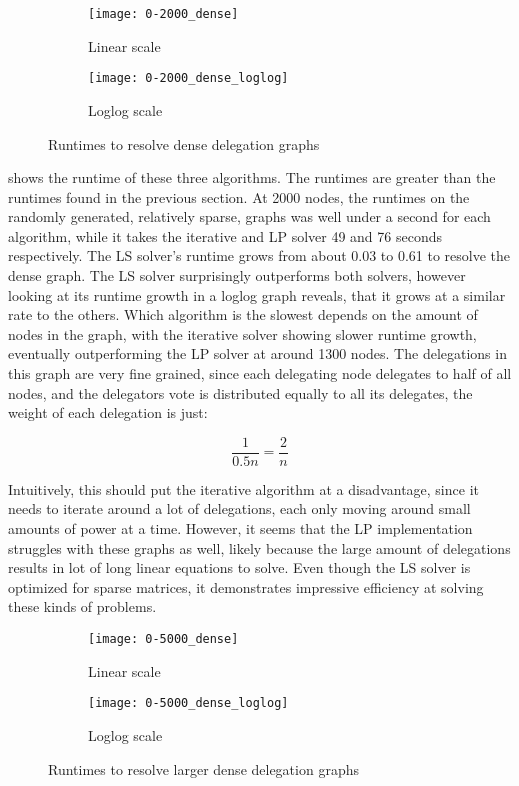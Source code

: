 \begin{figure}[t]
    \centering
    \begin{subfigure}[t]{0.45\textwidth}
    	\centering
    	\texttt{[image: 0-2000\_dense]}
    	\caption{Linear scale}
    	\label{fig:dense-linear}
    \end{subfigure}
    \hfill
    \begin{subfigure}[t]{0.45\textwidth}
        \centering
        \texttt{[image: 0-2000\_dense\_loglog]}
        \caption{Loglog scale}
         \label{subfig:dense-loglog}
    \end{subfigure}
    \caption{Runtimes to resolve dense delegation graphs}
    \label{fig:dense}
\end{figure}

 shows the runtime of these three algorithms. The runtimes are greater than the runtimes found in the previous section. At 2000 nodes, the runtimes on the randomly generated, relatively sparse, graphs was well under a second for each algorithm, while it takes the iterative and LP solver 49 and 76 seconds respectively. The LS solver's runtime grows from about 0.03 to 0.61 to resolve the dense graph. The LS solver surprisingly outperforms both solvers, however looking at its runtime growth in a loglog graph reveals, that it grows at a similar rate to the others. Which algorithm is the slowest depends on the amount of nodes in the graph, with the iterative solver showing slower runtime growth, eventually outperforming the LP solver at around 1300 nodes. The delegations in this graph are very fine grained, since each delegating node delegates to half of all nodes, and the delegators vote is distributed equally to all its delegates, the weight of each delegation is just:

\[ 
\frac{1}{0.5n} = \frac{2}{n} 
\]

Intuitively, this should put the iterative algorithm at a disadvantage, since it needs to iterate around a lot of delegations, each only moving around small amounts of power at a time. However, it seems that the LP implementation struggles with these graphs as well, likely because the large amount of delegations results in lot of long linear equations to solve. Even though the LS solver is optimized for sparse matrices, it demonstrates impressive efficiency at solving these kinds of problems.

\begin{figure}[t]
    \centering
    \begin{subfigure}[t]{0.45\textwidth}
    	\centering
    	\texttt{[image: 0-5000\_dense]}
    	\caption{Linear scale}
    	\label{subfig:dense-large-linear}
    \end{subfigure}
    \hfill
    \begin{subfigure}[t]{0.45\textwidth}
        \centering
        \texttt{[image: 0-5000\_dense\_loglog]}
        \caption{Loglog scale}
         \label{subfig:dense-large-loglog}
    \end{subfigure}
    \caption{Runtimes to resolve larger dense delegation graphs}
    \label{fig:dense-large}
\end{figure}

